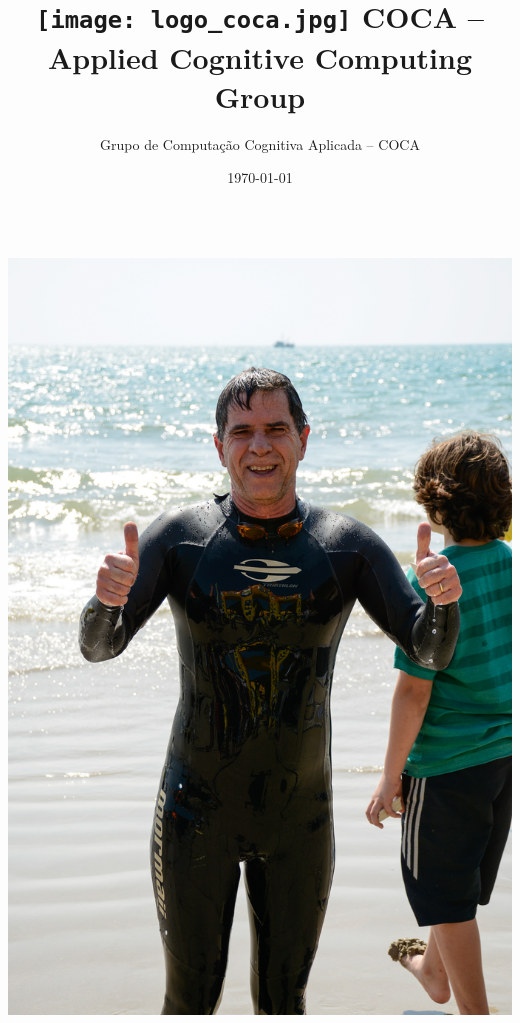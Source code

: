 \documentclass{beamer}
\title[Your Short Title]{ \texttt{[image: logo\_coca.jpg]} \hspace{1cm}  COCA -- Applied Cognitive Computing Group}
\author{Grupo de Computação Cognitiva Aplicada -- COCA}
\institute{Computer Science Department -- UDESC}
\date{\today}
\begin{document}



\begin{frame}
\begin{columns}[T]

    \begin{column}{.6\textwidth}
     \begin{block}{}

 \includegraphics[scale=0.3]{figures/maratona01.jpg}
  

\end{block}
\end{column}
\end{columns}
\end{frame}
\end{document}
